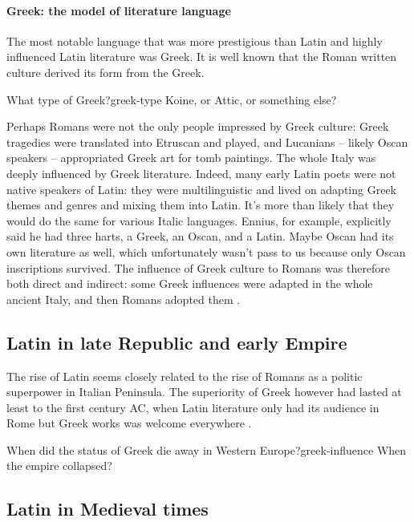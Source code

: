 \documentclass[a4paper, oneside, 12pt]{report}
\newcommand*{\citepage}[1]{p.~{#1}}
\newcommand*{\citepages}[1]{pp.~{#1}}
\begin{document}
\paragraph*{Greek: the model of literature language}
The most notable language that was more prestigious than Latin and highly influenced Latin literature was Greek.
It is well known that the Roman written culture derived its form from the Greek.

\begin{todobox}{What type of Greek?}{greek-type}
    Koine, or Attic, or something else?
\end{todobox}

Perhaps Romans were not the only people impressed by Greek culture:
Greek tragedies were translated into Etruscan and played,
and Lucanians -- likely Oscan speakers -- appropriated Greek art for tomb paintings.
The whole Italy was deeply influenced by Greek literature.
Indeed, many early Latin poets were not native speakers of Latin: 
they were multilinguistic and lived on adapting Greek themes and genres and mixing them into Latin.
It's more than likely that they would do the same for various Italic languages.
Ennius, for example, explicitly said he had three harts, a Greek, an Oscan, and a Latin.
Maybe Oscan had its own literature as well,
which unfortunately wasn't pass to us because only Oscan inscriptions survived.
The influence of Greek culture to Romans was therefore both direct and indirect:
some Greek influences were adapted in the whole ancient Italy,
and then Romans adopted them
\citep[\citepages{49-50}]{leonhardt2013latin}.



\subsection{Latin in late Republic and early Empire}

The rise of Latin seems closely related to the rise of Romans as a politic superpower
in Italian Peninsula.
The superiority of Greek however had lasted at least to the first century AC,
when Latin literature only had its audience in Rome
but Greek works was welcome everywhere
\citep[\citepage{52}]{leonhardt2013latin}. 

\begin{todobox}{When did the status of Greek die away in Western Europe?}{greek-influence}
    When the empire collapsed?
\end{todobox}

\subsection{Latin in Medieval times}
\end{document}

